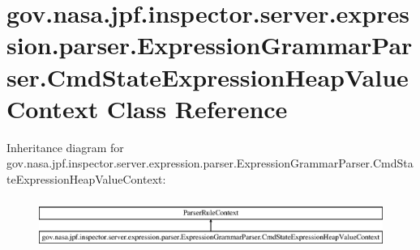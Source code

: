\hypertarget{classgov_1_1nasa_1_1jpf_1_1inspector_1_1server_1_1expression_1_1parser_1_1_expression_grammar_pa975e8909fcf76b653e93728b8bf729a1}{}\section{gov.\+nasa.\+jpf.\+inspector.\+server.\+expression.\+parser.\+Expression\+Grammar\+Parser.\+Cmd\+State\+Expression\+Heap\+Value\+Context Class Reference}
\label{classgov_1_1nasa_1_1jpf_1_1inspector_1_1server_1_1expression_1_1parser_1_1_expression_grammar_pa975e8909fcf76b653e93728b8bf729a1}
Inheritance diagram for gov.\+nasa.\+jpf.\+inspector.\+server.\+expression.\+parser.\+Expression\+Grammar\+Parser.\+Cmd\+State\+Expression\+Heap\+Value\+Context\+:\begin{figure}[H]
\begin{center}
\leavevmode
\includegraphics[height=1.666667cm]{classgov_1_1nasa_1_1jpf_1_1inspector_1_1server_1_1expression_1_1parser_1_1_expression_grammar_pa975e8909fcf76b653e93728b8bf729a1}
\end{center}
\end{figure}
